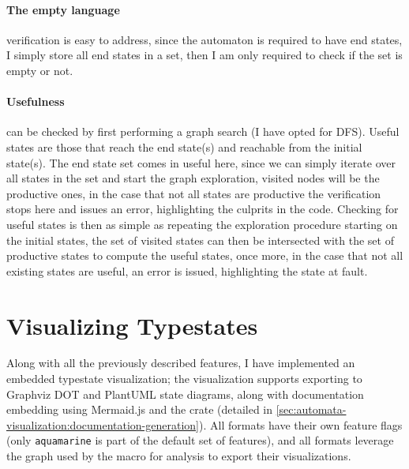 \paragraph{The empty language} verification is easy to address, since the automaton is required to have end states,
I simply store all end states in a set, then I am only required to check if the set is empty or not.

\paragraph{Usefulness} can be checked by first performing a graph search (I have opted for \gls{DFS}).
Useful states are those that reach the end state(s)  and reachable from the initial state(s).
The end state set comes in useful here, since we can simply iterate over all states in the set and start the graph exploration,
visited nodes will be the productive ones, in the case that not all states are productive the verification stops here and issues an error,
highlighting the culprits in the code.
Checking for useful states is then as simple as repeating the exploration procedure starting on the initial states,
the set of visited states can then be intersected with the set of productive states to compute the useful states,
once more, in the case that not all existing states are useful, an error is issued, highlighting the state at fault.


\section{Visualizing Typestates}\label{sec:automata-visualization}

Along with all the previously described features, I have implemented an embedded typestate visualization;
the visualization supports exporting to Graphviz DOT and
PlantUML state diagrams,
along with documentation embedding using Mermaid.js
and the  crate (detailed in \autoref{sec:automata-visualization:documentation-generation}).
All formats have their own feature flags (only \texttt{aquamarine} is part of the default set of features),
and all formats leverage the graph used by the macro for analysis to export their visualizations.

